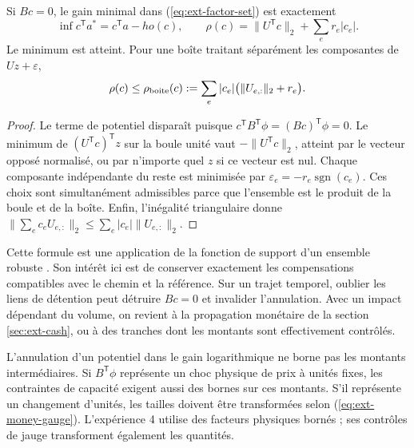 \begin{proposition}
Si \(Bc=0\), le gain minimal dans (\ref{eq:ext-factor-set}) est exactement
\begin{equation}
 \inf c^{\mathsf T}a^*=c^{\mathsf T}a-
ho(c),\qquad
 \rho(c)=\lVert U^{\mathsf T}c\rVert_2+\sum_e r_e|c_e|.
 \label{eq:ext-support}
\end{equation}
Le minimum est atteint. Pour une boîte traitant séparément les composantes de \(Uz+\varepsilon\),
\begin{equation}
 \rho(c)\le\rho_{\rm boite}(c)
 :=\sum_e|c_e|\bigl(\lVert U_{e,:}\rVert_2+r_e\bigr).
 \label{eq:ext-box}
\end{equation}
\end{proposition}
\begin{proof}
Le terme de potentiel disparaît puisque \(c^{\mathsf T}B^{\mathsf T}\phi=(Bc)^{\mathsf T}\phi=0\). Le minimum de \((U^{\mathsf T}c)^{\mathsf T}z\) sur la boule unité vaut \(-\lVert U^{\mathsf T}c\rVert_2\), atteint par le vecteur opposé normalisé, ou par n'importe quel \(z\) si ce vecteur est nul. Chaque composante indépendante du reste est minimisée par \(\varepsilon_e=-r_e\operatorname{sgn}(c_e)\). Ces choix sont simultanément admissibles parce que l'ensemble est le produit de la boule et de la boîte. Enfin, l'inégalité triangulaire donne \(\lVert\sum_ec_eU_{e,:}\rVert_2\le\sum_e|c_e|\lVert U_{e,:}\rVert_2\).
\end{proof}

Cette formule est une application de la fonction de support d'un ensemble robuste \cite{ext-robust}. Son intérêt ici est de conserver exactement les compensations compatibles avec le chemin et la référence. Sur un trajet temporel, oublier les liens de détention peut détruire \(Bc=0\) et invalider l'annulation. Avec un impact dépendant du volume, on revient à la propagation monétaire de la section \ref{sec:ext-cash}, ou à des tranches dont les montants sont effectivement contrôlés.

L'annulation d'un potentiel dans le gain logarithmique ne borne pas les montants intermédiaires. Si \(B^{\mathsf T}\phi\) représente un choc physique de prix à unités fixes, les contraintes de capacité exigent aussi des bornes sur ces montants. S'il représente un changement d'unités, les tailles doivent être transformées selon (\ref{eq:ext-money-gauge}). L'expérience 4 utilise des facteurs physiques bornés ; ses contrôles de jauge transforment également les quantités.

